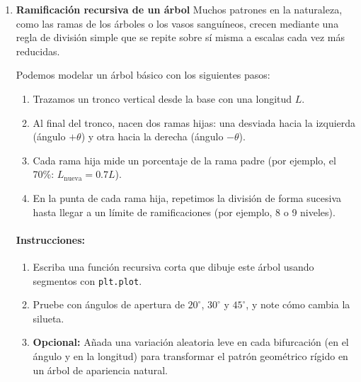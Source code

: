 \documentclass[12pt]{article}
\begin{document}
\begin{problemas}[]
\begin{enumerate}[leftmargin=*]
\paragraph{Instrucciones:}
\begin{enumerate}
    \item Escriba un script que genere $50\,000$ puntos siguiendo estas reglas usando el generador de números aleatorios de NumPy.
    \item Descarte los primeros 100 puntos (son el transitorio mientras el caminante entra en la figura).
    \item Grafique todos los puntos acumulados con \texttt{plt.scatter} usando puntos muy pequeños (\texttt{s=0.1}). Verá formarse el triángulo de Sierpinski, con triángulos vacíos a todas las escalas.
\end{enumerate}

\item \textbf{Ramificación recursiva de un árbol} Muchos patrones en la naturaleza, como las ramas de los árboles o los vasos sanguíneos, crecen mediante una regla de división simple que se repite sobre sí misma a escalas cada vez más reducidas.

Podemos modelar un árbol básico con los siguientes pasos:
\begin{enumerate}
    \item Trazamos un tronco vertical desde la base con una longitud $L$.
    \item Al final del tronco, nacen dos ramas hijas: una desviada hacia la izquierda (ángulo $+\theta$) y otra hacia la derecha (ángulo $-\theta$).
    \item Cada rama hija mide un porcentaje de la rama padre (por ejemplo, el 70\%: $L_{\text{nueva}} = 0.7 L$).
    \item En la punta de cada rama hija, repetimos la división de forma sucesiva hasta llegar a un límite de ramificaciones (por ejemplo, 8 o 9 niveles).
\end{enumerate}

\paragraph{Instrucciones:}
\begin{enumerate}
    \item Escriba una función recursiva corta que dibuje este árbol usando segmentos con \texttt{plt.plot}.
    \item Pruebe con ángulos de apertura de $20^\circ$, $30^\circ$ y $45^\circ$, y note cómo cambia la silueta.
    \item \textbf{Opcional:} Añada una variación aleatoria leve en cada bifurcación (en el ángulo y en la longitud) para transformar el patrón geométrico rígido en un árbol de apariencia natural.
\end{enumerate}


\end{enumerate}
\end{problemas}
\end{document}
